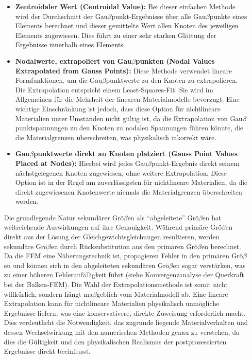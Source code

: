 \begin{itemize}
\item \textbf{Zentroidaler Wert (Centroidal Value):} Bei dieser einfachen Methode wird der Durchschnitt der Gau$\beta$punkt-Ergebnisse über alle Gau$\beta$punkte eines Elements berechnet und dieser gemittelte Wert allen Knoten des jeweiligen Elements zugewiesen. Dies führt zu einer sehr starken Glättung der Ergebnisse innerhalb eines Elements.


\item \textbf{Nodalwerte, extrapoliert von Gau$\beta$punkten (Nodal Values Extrapolated from Gauss Points):} Diese Methode verwendet lineare Formfunktionen, um die Gau$\beta$punktwerte zu den Knoten zu extrapolieren. Die Extrapolation entspricht einem Least-Squares-Fit. Sie wird im Allgemeinen für die Mehrheit der linearen Materialmodelle bevorzugt. Eine wichtige Einschränkung ist jedoch, dass diese Option für nichtlineare Materialien unter Umständen nicht gültig ist, da die Extrapolation von Gau$\beta$punktspannungen zu den Knoten zu nodalen Spannungen führen könnte, die die Materialgrenzen überschreiten, was physikalisch inkorrekt wäre.


\item \textbf{Gau$\beta$punktwerte direkt an Knoten platziert (Gauss Point Values Placed at Nodes):} Hierbei wird jedes Gau$\beta$punkt-Ergebnis direkt seinem nächstgelegenen Knoten zugewiesen, ohne weitere Extrapolation. Diese Option ist in der Regel am zuverlässigsten für nichtlineare Materialien, da die direkt zugewiesenen Knotenwerte niemals die Materialgrenzen überschreiten werden.
\end{itemize}

Die grundlegende Natur sekundärer Grö$\beta$en als ``abgeleitete'' Grö$\beta$en hat weitreichende Auswirkungen auf ihre Genauigkeit. Während primäre Grö$\beta$en direkt aus der Lösung der Gleichgewichtsgleichungen resultieren, werden sekundäre Grö$\beta$en durch Rücksubstitution aus den primären Grö$\beta$en berechnet. Da die FEM eine Näherungstechnik ist, propagieren Fehler in den primären Grö$\beta$en und können sich in den abgeleiteten sekundären Grö$\beta$en sogar verstärken, was zu einer höheren Fehleranfälligkeit führt (siehe Konvergenzanalyse der Querkraft bei der Balken-FEM). Die Wahl der Extrapolationsmethode ist somit nicht willkürlich, sondern hängt ma$\beta$geblich vom Materialmodell ab. Eine lineare Extrapolation kann für nichtlineare Materialien physikalisch unmögliche Ergebnisse liefern, was eine konservativere, direkte Zuweisung erforderlich macht. Dies verdeutlicht die Notwendigkeit, das zugrunde liegende Materialverhalten und dessen Wechselwirkung mit den numerischen Methoden genau zu verstehen, da dies die Gültigkeit und den physikalischen Realismus der postprozessierten Ergebnisse direkt beeinflusst.

